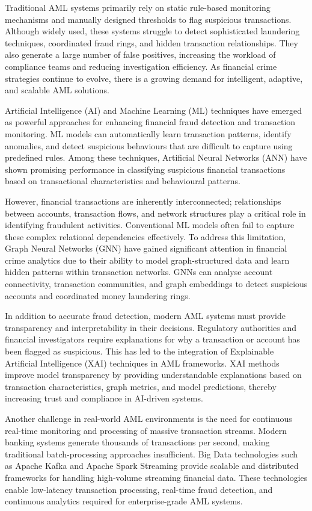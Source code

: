 \documentclass[conference]{IEEEtran}
\begin{document}
Traditional AML systems primarily rely on static rule-based monitoring mechanisms and manually designed thresholds to flag suspicious transactions. Although widely used, these systems struggle to detect sophisticated laundering techniques, coordinated fraud rings, and hidden transaction relationships. They also generate a large number of false positives, increasing the workload of compliance teams and reducing investigation efficiency. As financial crime strategies continue to evolve, there is a growing demand for intelligent, adaptive, and scalable AML solutions.

Artificial Intelligence (AI) and Machine Learning (ML) techniques have emerged as powerful approaches for enhancing financial fraud detection and transaction monitoring. ML models can automatically learn transaction patterns, identify anomalies, and detect suspicious behaviours that are difficult to capture using predefined rules. Among these techniques, Artificial Neural Networks (ANN) have shown promising performance in classifying suspicious financial transactions based on transactional characteristics and behavioural patterns.

However, financial transactions are inherently interconnected; relationships between accounts, transaction flows, and network structures play a critical role in identifying fraudulent activities. Conventional ML models often fail to capture these complex relational dependencies effectively. To address this limitation, Graph Neural Networks (GNN) have gained significant attention in financial crime analytics due to their ability to model graph-structured data and learn hidden patterns within transaction networks. GNNs can analyse account connectivity, transaction communities, and graph embeddings to detect suspicious accounts and coordinated money laundering rings.

In addition to accurate fraud detection, modern AML systems must provide transparency and interpretability in their decisions. Regulatory authorities and financial investigators require explanations for why a transaction or account has been flagged as suspicious. This has led to the integration of Explainable Artificial Intelligence (XAI) techniques in AML frameworks. XAI methods improve model transparency by providing understandable explanations based on transaction characteristics, graph metrics, and model predictions, thereby increasing trust and compliance in AI-driven systems.

Another challenge in real-world AML environments is the need for continuous real-time monitoring and processing of massive transaction streams. Modern banking systems generate thousands of transactions per second, making traditional batch-processing approaches insufficient. Big Data technologies such as Apache Kafka and Apache Spark Streaming provide scalable and distributed frameworks for handling high-volume streaming financial data. These technologies enable low-latency transaction processing, real-time fraud detection, and continuous analytics required for enterprise-grade AML systems.
\end{document}
